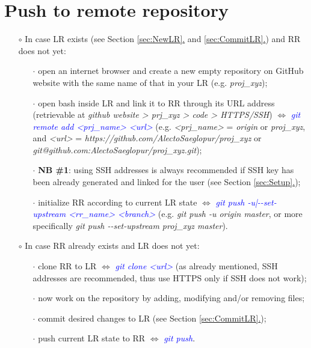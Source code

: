 \documentclass[a4paper,portrait,10pt]{article}   %
\newcommand{\mydiv}{$\Leftrightarrow$ }   %
\newcommand{\mycmd}[1]{\textcolor{blue}{\textit{#1}}}   %
\newcommand{\myvspace}{\vspace{4mm}}   %
\newcommand{\mysecref}[1]{\hyperref[#1]{\ref{#1}.}}   %
\begin{document}
\section{Push to remote repository}   \label{sec:PushRR}

\begin{itemize}
\item[$\circ$] In case LR exists (see Section \mysecref{sec:NewLR} and \mysecref{sec:CommitLR}) and RR does not yet:
\begin{itemize}
  \item[$\cdot$] open an internet browser and create a new empty repository on GitHub website with the same name of that in your LR (e.g. \textit{proj\_xyz});
  \item[$\cdot$] open bash inside LR and link it to RR through its URL address (retrievable at \textit{github website > prj\_xyz > code > HTTPS/SSH}) \mydiv \mycmd{git remote add <prj\_name> <url>} (e.g. \textit{<prj\_name>} = \textit{origin} or \textit{proj\_xyz}, and \textit{<url>} = \textit{https://github.com/AlectoSaeglopur/proj\_xyz} or \textit{git@github.com:AlectoSaeglopur/proj\_xyz.git});
  \item[$\cdot$] \textbf{NB \#1}: using SSH addresses is always recommended if SSH key has been already generated and linked for the user (see Section \mysecref{sec:Setup});
  \item[$\cdot$] initialize RR according to current LR state \mydiv \mycmd{git push -u|-{}-set-upstream <rr\_name> <branch>} (e.g. \textit{git push -u origin master}, or more specifically \textit{git push -{}-set-upstream proj\_xyz master}).
\end{itemize}
\myvspace

\item[$\circ$] In case RR already exists and LR does not yet:
\begin{itemize}
  \item[$\cdot$] clone RR to LR \mydiv \mycmd{git clone <url>} (as already mentioned, SSH addresses are recommended, thus use HTTPS only if SSH does not work);
  \item[$\cdot$] now work on the repository by adding, modifying and/or removing files;
  \item[$\cdot$] commit desired changes to LR (see Section \mysecref{sec:CommitLR});
  \item[$\cdot$] push current LR state to RR \mydiv \mycmd{git push}.
\end{itemize}
\end{itemize}
\myvspace
\end{document}
